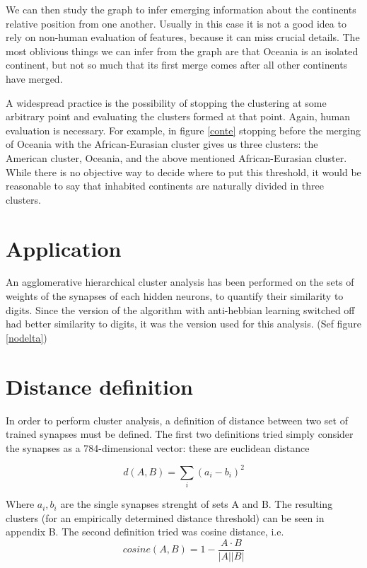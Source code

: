 \documentclass[a4paper]{report}
\begin{document}
We can then study the graph to infer emerging information about the continents relative position from one another. Usually in this case it is not a good idea to rely on non-human evaluation of features, because it can miss crucial details. The most oblivious things we can infer from the graph are that Oceania is an isolated continent, but not so much that its first merge comes after all other continents have merged.

A widespread practice is the possibility of stopping the clustering at some arbitrary point and evaluating the clusters formed at that point. Again, human evaluation is necessary. For example, in figure \ref{conte} stopping before the merging of Oceania with the African-Eurasian cluster gives us three clusters: the American cluster, Oceania, and the above mentioned African-Eurasian cluster. While there is no objective way to decide where to put this threshold, it would be reasonable to say that inhabited continents are naturally divided in three clusters.

\section{Application}

An agglomerative hierarchical cluster analysis has been performed on the sets of weights of the synapses of each hidden neurons, to quantify their similarity to digits. Since the version of the algorithm with anti-hebbian learning switched off had better similarity to digits, it was the version used for this analysis. (Sef figure \ref{nodelta})

\section{Distance definition}

In order to perform cluster analysis, a definition of distance between two set of trained synapses must be defined. The first two definitions tried simply consider the synapses as a 784-dimensional vector: these are euclidean distance

\begin{equation}
    d(A,B) = \sum_i (a_i-b_i)^2
\end{equation}

Where $a_i, b_i$ are the single synapses strenght of sets A and B. The resulting clusters (for an empirically determined distance threshold) can be seen in appendix B.
The second definition tried was cosine distance, i.e.
\begin{equation}
    cosine(A,B) = 1 - \frac{A \cdot B}{|A||B|} 
\end{equation}
\end{document}
